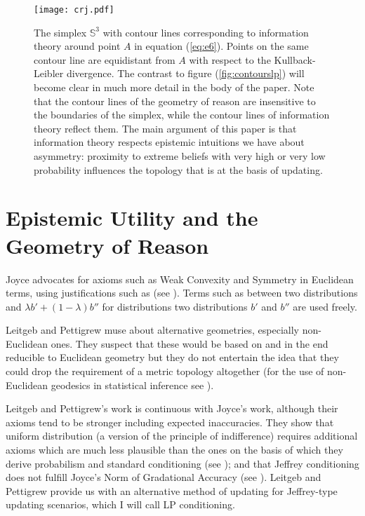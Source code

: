 \documentclass[11pt]{article} \usepackage{october} \onehalfspacing
\begin{document}
\begin{figure}[ht]
  \begin{flushright}
    \begin{minipage}[h]{.7\linewidth}
      \texttt{[image: crj.pdf]}
      \caption{\footnotesize The simplex $\mathbb{S}^{3}$ with contour
        lines corresponding to information theory around point $A$ in
        equation (\ref{eq:e6}). Points on the same contour line are
        equidistant from $A$ with respect to the Kullback-Leibler
        divergence. The contrast to figure (\ref{fig:contourslp}) will
        become clear in much more detail in the body of the paper.
        Note that the contour lines of the geometry of reason are
        insensitive to the boundaries of the simplex, while the
        contour lines of information theory reflect them. The main
        argument of this paper is that information theory respects
        epistemic intuitions we have about asymmetry: proximity to
        extreme beliefs with very high or very low probability
        influences the topology that is at the basis of updating.}
      \label{fig:contoursrj}
    \end{minipage}
  \end{flushright}
\end{figure}

\section{Epistemic Utility and the Geometry of Reason}
\label{eugr}

Joyce advocates for axioms such as Weak Convexity and Symmetry in
Euclidean terms, using justifications such as  (see ). Terms
such as  between two distributions and
$\lambda{}b'+(1-\lambda)b''$ for distributions  two
distributions $b'$ and $b''$ are used freely.

Leitgeb and Pettigrew muse about alternative geometries, especially
non-Euclidean ones. They suspect that these would be based on and in
the end reducible to Euclidean geometry but they do not entertain the
idea that they could drop the requirement of a metric topology
altogether (for the use of non-Euclidean geodesics in statistical
inference see ).

Leitgeb and Pettigrew's work is continuous with Joyce's work, although
their axioms tend to be stronger including expected inaccuracies. They
show that uniform distribution (a version of the principle of
indifference) requires additional axioms which are much less plausible
than the ones on the basis of which they derive probabilism and
standard conditioning (see ); and
that Jeffrey conditioning does not fulfill Joyce's Norm of Gradational
Accuracy (see ). Leitgeb and Pettigrew provide
us with an alternative method of updating for Jeffrey-type updating
scenarios, which I will call LP conditioning.
\end{document}

